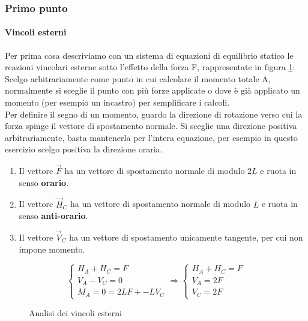\documentclass[main.tex]{subfiles}
\begin{document}
\subsubsection{Primo punto}

\paragraph{Vincoli esterni}
Per prima cosa descriviamo con un sistema di equazioni di equilibrio statico le reazioni vincolari esterne sotto l'effetto della forza F, rappresentate in figura \ref{vincoli_esterni_2014_2409_2}:
\\

Scelgo arbitrariamente come punto in cui calcolare il momento totale A, normalmente si sceglie il punto con più forze applicate o dove è già applicato un momento (per esempio un incastro) per semplificare i calcoli.
\\

Per definire il segno di un momento, guardo la direzione di rotazione verso cui la forza spinge il vettore di spostamento normale. Si sceglie una direzione positiva arbitrariamente, basta mantenerla per l'intera equazione, per esempio in questo esercizio scelgo positiva la direzione oraria.

\begin{enumerate}
\item Il vettore $\vec{F}$ ha un vettore di spostamento normale di modulo $2L$ e ruota in senso \textbf{orario}.
\item Il vettore $\vec{H}_C$ ha un vettore di spostamento normale di modulo $L$ e ruota in senso \textbf{anti-orario}.
\item Il vettore $\vec{V}_C$ ha un vettore di spostamento unicamente tangente, per cui non impone momento.
\end{enumerate}

\[
\begin{cases}
	H_A + H_C = F	\\
	V_A - V_C = 0\\
	M_A = 0 = 2LF + -LV_C
\end{cases}
\Longrightarrow
\begin{cases}
	H_A + H_C = F	\\
	V_A = 2F\\
	V_C = 2F
\end{cases}
\]

\begin{figure}[H]
\centering
\resizebox{.5\textwidth}{!}{}
\caption{Analisi dei vincoli esterni}
\label{vincoli_esterni_2014_2409_2}
\end{figure}
\end{document}
